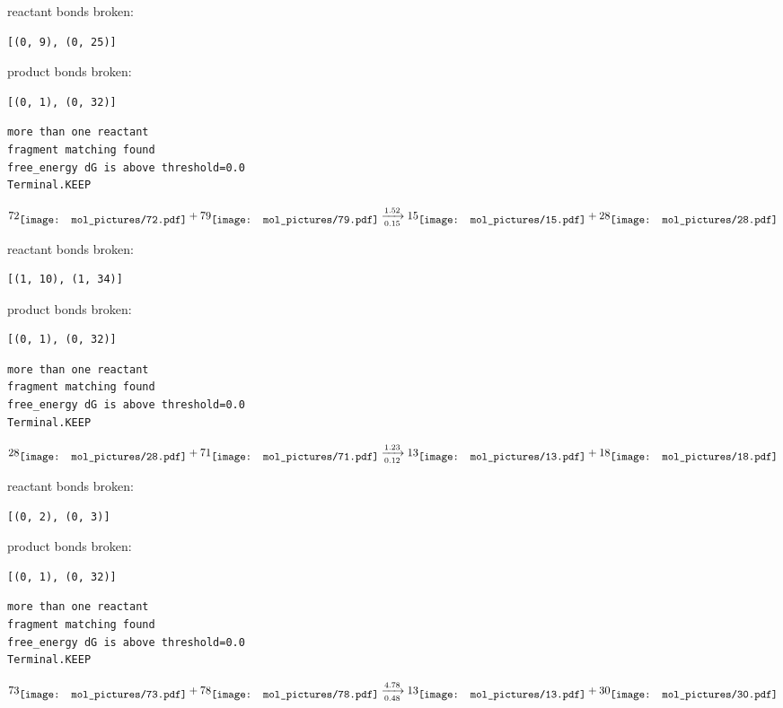 \documentclass{article}
\begin{document}
reactant bonds broken:\begin{verbatim}
[(0, 9), (0, 25)]
\end{verbatim}
product bonds broken:\begin{verbatim}
[(0, 1), (0, 32)]
\end{verbatim}




\vspace{1cm}
\begin{verbatim}
more than one reactant
fragment matching found
free_energy dG is above threshold=0.0
Terminal.KEEP
\end{verbatim}
$$
72
\raisebox{-.5\height}{\texttt{[image: mol\_pictures/72.pdf]}}
+
79
\raisebox{-.5\height}{\texttt{[image: mol\_pictures/79.pdf]}}
\xrightarrow[0.15]{1.52}
15
\raisebox{-.5\height}{\texttt{[image: mol\_pictures/15.pdf]}}
+
28
\raisebox{-.5\height}{\texttt{[image: mol\_pictures/28.pdf]}}
$$


reactant bonds broken:\begin{verbatim}
[(1, 10), (1, 34)]
\end{verbatim}
product bonds broken:\begin{verbatim}
[(0, 1), (0, 32)]
\end{verbatim}




\vspace{1cm}
\begin{verbatim}
more than one reactant
fragment matching found
free_energy dG is above threshold=0.0
Terminal.KEEP
\end{verbatim}
$$
28
\raisebox{-.5\height}{\texttt{[image: mol\_pictures/28.pdf]}}
+
71
\raisebox{-.5\height}{\texttt{[image: mol\_pictures/71.pdf]}}
\xrightarrow[0.12]{1.23}
13
\raisebox{-.5\height}{\texttt{[image: mol\_pictures/13.pdf]}}
+
18
\raisebox{-.5\height}{\texttt{[image: mol\_pictures/18.pdf]}}
$$


reactant bonds broken:\begin{verbatim}
[(0, 2), (0, 3)]
\end{verbatim}
product bonds broken:\begin{verbatim}
[(0, 1), (0, 32)]
\end{verbatim}




\vspace{1cm}
\begin{verbatim}
more than one reactant
fragment matching found
free_energy dG is above threshold=0.0
Terminal.KEEP
\end{verbatim}
$$
73
\raisebox{-.5\height}{\texttt{[image: mol\_pictures/73.pdf]}}
+
78
\raisebox{-.5\height}{\texttt{[image: mol\_pictures/78.pdf]}}
\xrightarrow[0.48]{4.78}
13
\raisebox{-.5\height}{\texttt{[image: mol\_pictures/13.pdf]}}
+
30
\raisebox{-.5\height}{\texttt{[image: mol\_pictures/30.pdf]}}
$$
\end{document}
